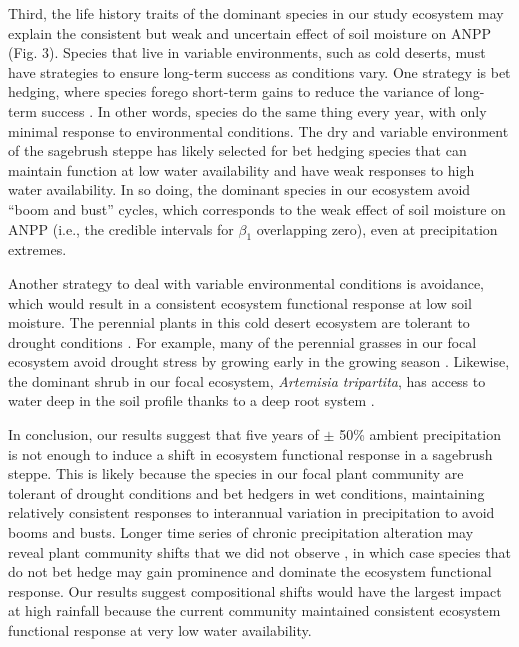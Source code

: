 \documentclass[fleqn,10pt,lineno]{wlpeerj} %
\begin{document}
Third, the life history traits of the dominant species in our study
ecosystem may explain the consistent but weak and uncertain effect of
soil moisture on ANPP (Fig. 3). Species that live in variable
environments, such as cold deserts, must have strategies to ensure
long-term success as conditions vary. One strategy is bet hedging, where
species forego short-term gains to reduce the variance of long-term
success \citep{Seger1987}. In other words, species do the same thing
every year, with only minimal response to environmental conditions. The
dry and variable environment of the sagebrush steppe has likely selected
for bet hedging species that can maintain function at low water
availability and have weak responses to high water availability. In so
doing, the dominant species in our ecosystem avoid ``boom and bust''
cycles, which corresponds to the weak effect of soil moisture on ANPP
(i.e., the credible intervals for \(\beta_1\) overlapping zero), even at
precipitation extremes.

Another strategy to deal with variable environmental conditions is
avoidance, which would result in a consistent ecosystem functional
response at low soil moisture. The perennial plants in this cold desert
ecosystem are tolerant to drought conditions \citep[A.R. Kleinhesselink,
unpublished data]{Bazzaz1979, Franks2011}. For example, many of the
perennial grasses in our focal ecosystem avoid drought stress by growing
early in the growing season \citep[A.R. Kleinhesselink, personal
observation]{Blaisdell1958}. Likewise, the dominant shrub in our focal
ecosystem, \emph{Artemisia tripartita}, has access to water deep in the
soil profile thanks to a deep root system \citep{Kulmatiski2017a}.

In conclusion, our results suggest that five years of \(\pm\) 50\%
ambient precipitation is not enough to induce a shift in ecosystem
functional response in a sagebrush steppe. This is likely because the
species in our focal plant community are tolerant of drought conditions
and bet hedgers in wet conditions, maintaining relatively consistent
responses to interannual variation in precipitation to avoid booms and
busts. Longer time series of chronic precipitation alteration may reveal
plant community shifts that we did not observe
\citep[e.g.,][]{Wilcox2016}, in which case species that do not bet hedge
may gain prominence and dominate the ecosystem functional response. Our
results suggest compositional shifts would have the largest impact at
high rainfall because the current community maintained consistent
ecosystem functional response at very low water availability.
\end{document}
